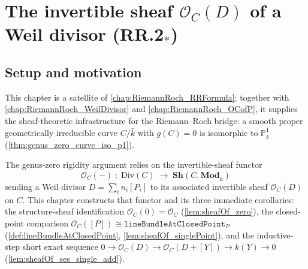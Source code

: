 
\chapter{The invertible sheaf \(\mathcal O_C(D)\) of a Weil divisor (RR.2\(_\ast\))}
\label{chap:RiemannRoch_OcOfD}


\section{Setup and motivation}

This chapter is a satellite of \cref{chap:RiemannRoch_RRFormula};
together with \cref{chap:RiemannRoch_WeilDivisor} and
\cref{chap:RiemannRoch_OCofP}, it supplies the sheaf-theoretic
infrastructure for the Riemann--Roch bridge: a smooth proper geometrically
irreducible curve \(C / \bar k\) with \(g(C) = 0\) is isomorphic to
\(\mathbb P^1_{\bar k}\) (\cref{thm:genus_zero_curve_iso_p1}).

The genus-zero rigidity argument relies on the invertible-sheaf functor
\[
  \mathcal O_C(-) \;\colon\; \mathrm{Div}(C) \;\longrightarrow\;
  \mathbf{Sh}(C, \mathbf{Mod}_{\bar k})
\]
sending a Weil divisor \(D = \sum_i n_i [P_i]\) to its associated invertible
sheaf \(\mathcal O_C(D)\) on \(C\). This chapter constructs that functor and
its three immediate corollaries: the structure-sheaf identification
\(\mathcal O_C(0) = \mathcal O_C\) (\cref{lem:sheafOf_zero}), the
closed-point comparison \(\mathcal O_C([P]) \cong
\texttt{lineBundleAtClosedPoint}_P\) (\cref{def:lineBundleAtClosedPoint},
\cref{lem:sheafOf_singlePoint}), and the inductive-step short exact
sequence \(0 \to \mathcal O_C(D) \to \mathcal O_C(D+[Y]) \to k(Y) \to 0\)
(\cref{lem:sheafOf_ses_single_add}).

